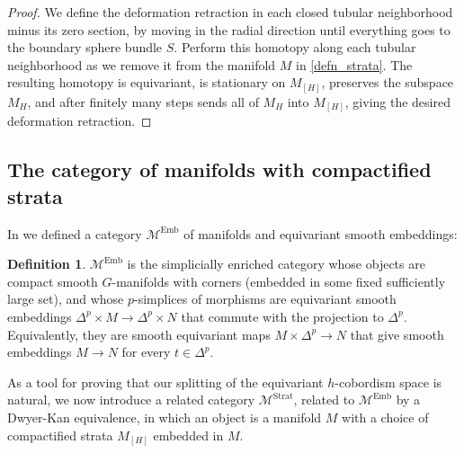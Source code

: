 \documentclass[11pt]{amsart}
\newtheorem{cor}{Corollary}[section]
\theoremstyle{definition}
\newtheorem{defn}{Definition}[section]
\numberwithin{equation}{section}
\numberwithin{figure}{section}
\newcommand{\mc}{\mathcal}
\newcommand{\Man}{\mc M^\mathrm{Emb}}
\newcommand{\Manstr}{\mc M^\mathrm{Strat}}
\begin{document}
\begin{proof}
	We define the deformation retraction in each closed tubular neighborhood minus its zero section, by moving in the radial direction until everything goes to the boundary sphere bundle $S$. Perform this homotopy along each tubular neighborhood as we remove it from the manifold $M$ in \autoref{defn_strata}. The resulting homotopy is equivariant, is stationary on $M_{[H]}$, preserves the subspace $M_H$, and after finitely many steps sends all of $M_H$ into $M_{[H]}$, giving the desired deformation retraction. %
\end{proof}






\subsection{The category of manifolds with compactified strata}

In \cite[Def 6.10]{GIMM1} we defined a category $\Man$ of manifolds and equivariant smooth embeddings:
\begin{defn}\label{m_emb}
	$\Man$ is the simplicially enriched category whose objects are compact smooth $G$-manifolds with corners (embedded in some fixed sufficiently large set), and whose $p$-simplices of morphisms are equivariant smooth embeddings $\Delta^p \times M \to \Delta^p \times N$ that commute with the projection to $\Delta^p$. Equivalently, they are smooth equivariant maps $M \times \Delta^p \to N$ that give smooth embeddings $M \to N$ for every $t \in \Delta^p$.
\end{defn}


As a tool for proving that our splitting of the equivariant $h$-cobordism space is natural, we now introduce a related category $\Manstr$, related to $\Man$ by a Dwyer-Kan equivalence, in which an object is a manifold $M$ with a choice of compactified strata $M_{[H]}$ embedded in $M$. 
\end{document}
